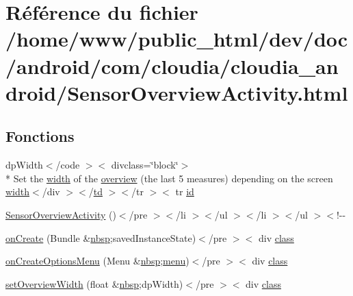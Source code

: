 \hypertarget{_sensor_overview_activity_8html}{\section{Référence du fichier /home/www/public\-\_\-html/dev/doc/android/com/cloudia/cloudia\-\_\-android/\-Sensor\-Overview\-Activity.html}
\label{_sensor_overview_activity_8html}
}
\subsection*{Fonctions}
\begin{DoxyCompactItemize}
\item 
dp\-Width$<$/code $>$$<$ divclass=\char`\"{}block\char`\"{}$>$\\*
 Set the \hyperlink{_splash_activity_8html_a1580ba2d499c65c8e87ac22a1ed5d7f2}{width} of the \hyperlink{_sensor_overview_activity_8html_a8a9eb4928f27f52b33c3510380ee5501}{overview} (the last 5 measures) depending on the screen \hyperlink{_splash_activity_8html_a1580ba2d499c65c8e87ac22a1ed5d7f2}{width}$<$/div $>$$<$/\hyperlink{stylesheet_8css_a2635d454965afd759ce151c6f6d1a04a}{td} $>$$<$/tr $>$$<$ tr \hyperlink{index-9_8html_aa9b8ff1d03b739d1e752b9d9a5aa7c98}{id}
\item 
\hyperlink{_sensor_overview_activity_8html_aa8baac428253875b42836e8e64e65712}{Sensor\-Overview\-Activity} ()$<$/pre $>$$<$/li $>$$<$/ul $>$$<$/li $>$$<$/ul $>$$<$!-\/-\/
\item 
\hyperlink{_sensor_overview_activity_8html_aba0a51a46194045c19fd67aa9ed0dd44}{on\-Create} (Bundle \&\hyperlink{_tools_8html_aef915316f784c9063d942974538301a6}{nbsp};saved\-Instance\-State)$<$/pre $>$$<$ div \hyperlink{_tools_8html_acf06f836132665ba8114f5a414c2403f}{class}
\item 
\hyperlink{_sensor_overview_activity_8html_ad8d185357392942cfdc98d8a6f3e53d3}{on\-Create\-Options\-Menu} (Menu \&\hyperlink{_tools_8html_aef915316f784c9063d942974538301a6}{nbsp};\hyperlink{index-11_8html_a130970675bc563bd79bc2a7254add303}{menu})$<$/pre $>$$<$ div \hyperlink{_tools_8html_acf06f836132665ba8114f5a414c2403f}{class}
\item 
\hyperlink{_sensor_overview_activity_8html_a22a6cd2190d3773055c226d0b769ed82}{set\-Overview\-Width} (float \&\hyperlink{_tools_8html_aef915316f784c9063d942974538301a6}{nbsp};dp\-Width)$<$/pre $>$$<$ div \hyperlink{_tools_8html_acf06f836132665ba8114f5a414c2403f}{class}

\end{DoxyCompactItemize}

